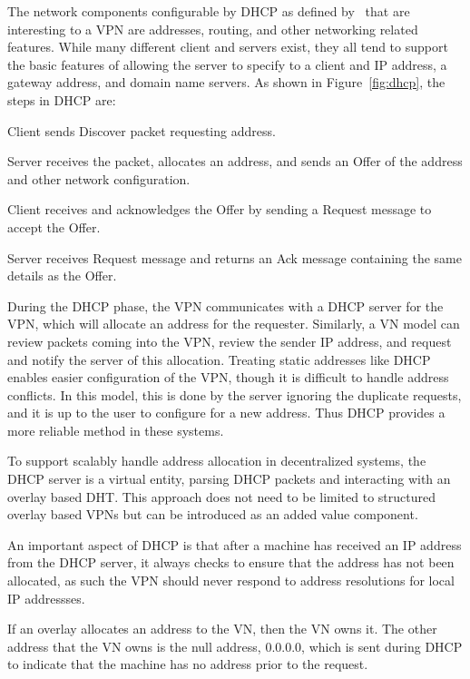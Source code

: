 The network components configurable by DHCP as defined by~\cite{dhcp0,dhcp1}
that are interesting to a VPN are addresses, routing, and other networking
related features.  While many different client and servers exist, they all tend
to support the basic features of allowing the server to specify to a client and
IP address, a gateway address, and domain name servers.  As shown in
Figure~\ref{fig:dhcp}, the steps in DHCP are:
\begin{enumerate}
\small{
\setlength{\itemsep}{0pt}
\setlength{\parskip}{0pt}
\item Client sends Discover packet requesting address.
\item Server receives the packet, allocates an address, and sends an Offer of
the address and other network configuration.
\item Client receives and acknowledges the Offer by sending a Request message
to accept the Offer.
\item Server receives Request message and returns an Ack message containing
the same details as the Offer.
}
\end{enumerate}

During the DHCP phase, the VPN communicates with a DHCP server for the VPN,
which will allocate an address for the requester.  Similarly, a VN model can
review packets coming into the VPN, review the sender IP address, and request
and notify the server of this allocation.  Treating static addresses like
DHCP enables easier configuration of the VPN, though it is difficult to handle
address conflicts.  In this model, this is done by the server ignoring the
duplicate requests, and it is up to the user to configure for a new address.
Thus DHCP provides a more reliable method in these systems.

To support scalably handle address allocation in decentralized systems, the
DHCP server is a virtual entity, parsing DHCP packets and interacting with
an overlay based DHT.  This approach does not need to be limited to structured
overlay based VPNs but can be introduced as an added value component.

An important aspect of DHCP is that after a machine has received an IP address
from the DHCP server, it always checks to ensure that the address has not been
allocated, as such the VPN should never respond to address resolutions for
local IP addressses.

If an overlay allocates an address to the VN, then the VN owns it.  The other
address that the VN owns is the null address, 0.0.0.0, which is sent during
DHCP to indicate that the machine has no address prior to the request.

